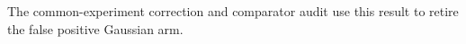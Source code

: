 The common-experiment correction and comparator audit use this result to retire the false positive Gaussian arm.